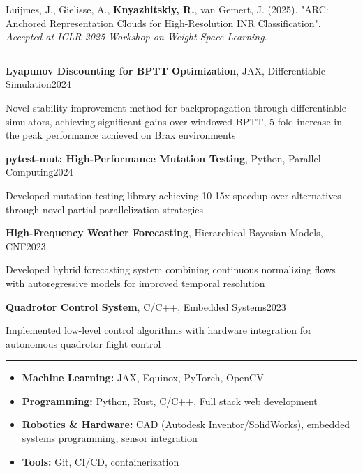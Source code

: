 \documentclass[11pt, a4paper]{article}
\newcommand{\entrytitle}[3]{%
    \noindent\textbf{#1}, #2\hfill#3%
}
\newcommand{\sectiontitle}[1]{\vspace{3mm}{\color{primaryColor}\noindent\textbf{#1}}\vspace{1.5mm}\hrule\vspace{2mm}}
\begin{document}
\noindent
Luijmes, J., Gielisse, A., \textbf{Knyazhitskiy, R.}, van Gemert, J. (2025). "ARC: Anchored Representation Clouds for High-Resolution INR Classification". \textit{Accepted at ICLR 2025 Workshop on Weight Space Learning}.

\vspace{-2mm}

\sectiontitle{Selected Projects}

\entrytitle{Lyapunov Discounting for BPTT Optimization}{JAX, Differentiable Simulation}{2024}
\begin{details}
    \item Novel stability improvement method for backpropagation through differentiable simulators, achieving significant gains over windowed BPTT, 5-fold increase in the peak performance achieved on Brax environments
\end{details}

\entrytitle{pytest-mut: High-Performance Mutation Testing}{Python, Parallel Computing}{2024}
\begin{details}
    \item Developed mutation testing library achieving 10-15x speedup over alternatives through novel partial parallelization strategies
\end{details}

\entrytitle{High-Frequency Weather Forecasting}{Hierarchical Bayesian Models, CNF}{2023}
\begin{details}
    \item Developed hybrid forecasting system combining continuous normalizing flows with autoregressive models for improved temporal resolution
\end{details}

\entrytitle{Quadrotor Control System}{C/C++, Embedded Systems}{2023}
\begin{details}
    \item Implemented low-level control algorithms with hardware integration for autonomous quadrotor flight control
\end{details}

\vspace{-2mm}

\sectiontitle{Skills}
\begin{itemize}
    \item \textbf{Machine Learning:} JAX, Equinox, PyTorch, OpenCV
    \item \textbf{Programming:} Python, Rust, C/C++, Full stack web development
    \item \textbf{Robotics \& Hardware:} CAD (Autodesk Inventor/SolidWorks), embedded systems programming, sensor integration
    \item \textbf{Tools:} Git, CI/CD, containerization
\end{itemize}
\end{document}
